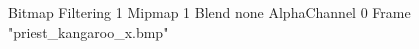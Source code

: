 {Bitmap
	{Filtering 1}
	{Mipmap 1}
	{Blend none}
	{AlphaChannel 0}
	{Frame "priest_kangaroo_x.bmp"}
}
